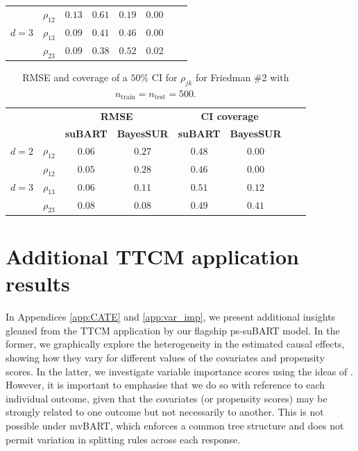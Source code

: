 \documentclass[aoas,preprint]{imsart}
\theoremstyle{plain}
\theoremstyle{definition}
\theoremstyle{remark}
\begin{document}
\begin{appendix}
\begin{table}[H]
\begin{tabular}{llcccccc}
\hline
\multirow{3}{*}{$d=3$}&{$\rho_{12}$} & $0.13$ & $0.61$ & $0.19$ & $0.00$ \\
&{$\rho_{13}$} & $0.09$ & $0.41$ & $0.46$ & $0.00$ \\
&{$\rho_{23}$} & $0.09$ & $0.38$ & $0.52$ & $0.02$ \\
\hline
\end{tabular}
\end{table}
\begin{table}[H]
\centering
\caption{RMSE and coverage of a $50\%$ CI for ${\rho}_{jk}$ for Friedman \#2 with $n_{\operatorname{train}} = n_{\operatorname{test}} = 500$.}
\label{tab:sim_corr_class_fried_one_combined_500}
\begin{tabular}{llcccccc}
\hline
\small
& & \multicolumn{2}{c}{\textbf{RMSE}} & \multicolumn{2}{c}{\textbf{CI coverage}} \\
& & \textbf{suBART} & \textbf{BayesSUR} & \textbf{suBART} & \textbf{BayesSUR} \\
\hline
$d=2$&{$\rho_{12}$} & $0.06$ & $0.27$ & $0.48$ & $0.00$ \\ 
\hline
\multirow{3}{*}{$d=3$}&{$\rho_{12}$} & $0.05$ & $0.28$ & $0.46$ & $0.00$ \\
&{$\rho_{13}$} & $0.06$ & $0.11$ & $0.51$ & $0.12$ \\
&{$\rho_{23}$} & $0.08$ & $0.08$ & $0.49$ & $0.41$ \\
\hline
\end{tabular}
\end{table}

\setcounter{figure}{0}
\setcounter{table}{0}
\section{Additional TTCM application results}\label{app:extraTTCM}

In Appendices \ref{app:CATE} and \ref{app:var_imp}, we present additional insights gleaned from the TTCM application by our flagship ps-suBART model. In the former, we graphically explore the heterogeneity in the estimated causal effects, showing how they vary for different values of the covariates and propensity scores. In the latter, we investigate variable importance scores using the ideas of \citet{chipman2010bart}. However, it is important to emphasise that we do so with reference to each individual outcome, given that the covariates (or propensity scores) may be strongly related to one outcome but not necessarily to another. This is not possible under mvBART, which enforces a common tree structure and does not permit variation in splitting rules across each response.


\end{appendix}
\end{document}
